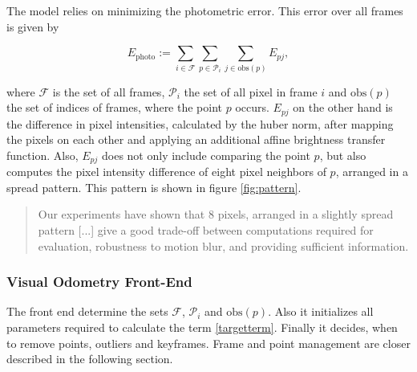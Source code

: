 	The model relies on minimizing the photometric error. This error over all frames is given by
	
	\begin{equation}
	E_{\text{photo}}:= \sum_{i \in \mathcal{F}} \sum_{p \in \mathcal{P}_i} \sum_{j \in \text{obs}\left(p\right)} E_{pj},
	\end{equation}\label{targetterm}
	
	
	where $\mathcal{F}$ is the set of all frames, $\mathcal{P}_i$ the set of all pixel in frame $i$ and $\text{obs}\left(p\right)$
	the set of indices of frames, where the point $p$ occurs. $E_{pj}$ on the other hand is the difference in pixel intensities, calculated 
	by the huber norm, after mapping the pixels on each other and applying an additional affine brightness transfer function. Also, $E_{pj}$ does not 
	only include comparing the point $p$, but also computes the pixel intensity difference of eight pixel neighbors of $p$, arranged in a spread pattern. 
	This pattern is shown in figure \ref{fig:pattern}. 
	
	\begin{quote}
	
Our experiments have shown that 8 pixels, arranged in a
slightly spread pattern [...] give a good trade-off
between computations required for evaluation, robustness
to motion blur, and providing sufficient information. \cite{dso}

	\end{quote}
	
	
	\subsubsection{Visual Odometry Front-End}
	
	The front end determine the sets $\mathcal{F}$, $\mathcal{P}_i$ and $\text{obs}\left(p\right)$. Also it initializes all parameters 
	required to calculate the term \ref{targetterm}. 
	Finally it decides, when to remove points, outliers and keyframes. Frame and point management are closer described in the following section. 
	
